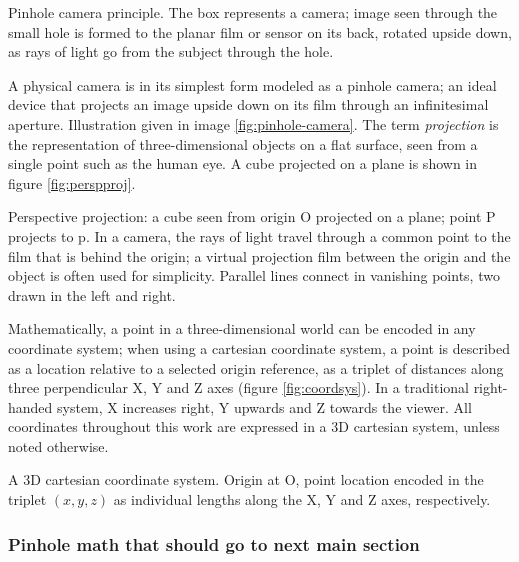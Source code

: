 

{Pinhole camera principle. The box represents a camera; image seen through the small hole is formed to the planar film or sensor on its back, rotated upside down, as rays of light go from the subject through the hole.}

A physical camera is in its simplest form modeled as a pinhole camera; an ideal device that projects an image upside down on its film through an infinitesimal aperture.
Illustration given in image \ref{fig:pinhole-camera}.
The term \emph{projection} is the representation of three-dimensional objects on a flat surface, seen from a single point such as the human eye.
A cube projected on a plane is shown in figure \ref{fig:perspproj}.

{Perspective projection: a cube seen from origin O projected on a plane; point P projects to p. In a camera, the rays of light travel through a common point to the film that is behind the origin; a virtual projection film between the origin and the object is often used for simplicity. Parallel lines connect in vanishing points, two drawn in the left and right.}



Mathematically, a point in a three-dimensional world can be encoded in any coordinate system;
when using a cartesian coordinate system, a point is described as a location relative to a selected origin reference, as a triplet of distances along three perpendicular X, Y and Z axes (figure \ref{fig:coordsys}).
In a traditional right-handed system, X increases right, Y upwards and Z towards the viewer.
All coordinates throughout this work are expressed in a 3D cartesian system, unless noted otherwise.

{A 3D cartesian coordinate system. Origin at O, point location encoded in the triplet $(x,y,z)$ as individual lengths along the X, Y and Z axes, respectively.}


\subsubsection{Pinhole math that should go to next main section}

